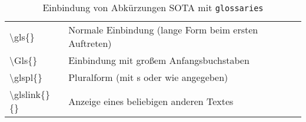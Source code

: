 \begin{table}[ht]
	\centering
	\caption{Einbindung von Abkürzungen SOTA mit  \texttt{glossaries}}
	\label{tab:glossariesusage}
	\begin{tabular}{ll} \toprule
		\textbackslash{}gls\{\} & Normale Einbindung (lange Form beim ersten Auftreten)\\
		\textbackslash{}Gls\{\} & Einbindung mit großem Anfangsbuchstaben\\
		\textbackslash{}glspl\{\} & Pluralform (mit s oder wie angegeben)\\
		\textbackslash{}glslink\{\}\{\} & Anzeige eines beliebigen anderen Textes\\
		\bottomrule
	\end{tabular}
\end{table}